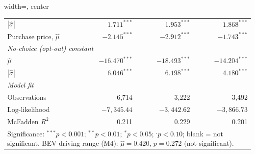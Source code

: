\begin{table}[pos=H]
\begin{adjustbox}{width=\textwidth, center}
{\begin{tabular}{lrrr}
\quad\quad $|\hat{\sigma}|$          & $1.711^{***}$   & $1.953^{***}$   & $1.868^{***}$  \\[3pt]
\quad Purchase price, $\hat{\mu}$    & $-2.145^{***}$  & $-2.912^{***}$  & $-1.743^{***}$ \\[3pt]
\multicolumn{4}{l}{\textit{No-choice (opt-out) constant}} \\[2pt]
\quad $\hat{\mu}$                    & $-16.470^{***}$ & $-18.493^{***}$ & $-14.204^{***}$\\
\quad\quad $|\hat{\sigma}|$          & $6.046^{***}$   & $6.198^{***}$   & $4.180^{***}$  \\
\midrule
\multicolumn{4}{l}{\textit{Model fit}} \\[2pt]
\quad Observations                   & 6,714           & 3,222           & 3,492          \\
\quad Log-likelihood                 & $-7{,}345.44$   & $-3{,}442.62$   & $-3{,}866.73$  \\
\quad McFadden $R^{2}$               & 0.211           & 0.229           & 0.201          \\
\bottomrule
\multicolumn{4}{p{\dimexpr\linewidth-2\tabcolsep\relax}}{\footnotesize
  Significance: $^{***}p<0.001$; $^{**}p<0.01$; $^{*}p<0.05$; $^{.}p<0.10$; blank = not significant. BEV driving range (M4): $\hat{\mu} = 0.420$, $p = 0.272$ (not significant).} \\
\end{tabular}}
\end{adjustbox}
\end{table}
